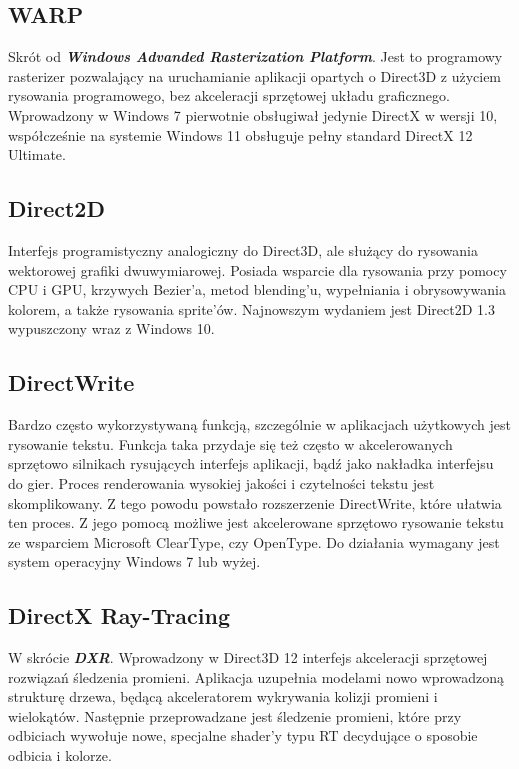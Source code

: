 \subsection{WARP}
Skrót od \emph{\textbf{Windows Advanded Rasterization Platform}}. Jest
to programowy rasterizer pozwalający na uruchamianie aplikacji opartych
o Direct3D z użyciem rysowania programowego, bez akceleracji sprzętowej
układu graficznego. Wprowadzony w Windows 7 pierwotnie obsługiwał jedynie DirectX w wersji
10, współcześnie na systemie Windows 11 obsługuje pełny standard DirectX
12 Ultimate.

\subsection{Direct2D}
Interfejs programistyczny analogiczny do Direct3D, ale służący do
rysowania wektorowej grafiki dwuwymiarowej. Posiada wsparcie dla
rysowania przy pomocy CPU i GPU, krzywych Bezier'a, metod blending'u,
wypełniania i obrysowywania kolorem, a także rysowania sprite'ów. Najnowszym wydaniem jest Direct2D 1.3 wypuszczony wraz z Windows 10.

\subsection{DirectWrite}
Bardzo często wykorzystywaną funkcją, szczególnie w aplikacjach
użytkowych jest rysowanie tekstu. Funkcja taka przydaje się też często w
akcelerowanych sprzętowo silnikach rysujących interfejs aplikacji, bądź
jako nakładka interfejsu do gier. Proces renderowania wysokiej jakości i czytelności tekstu jest
skomplikowany. Z tego powodu powstało rozszerzenie DirectWrite, które
ułatwia ten proces. Z jego pomocą możliwe jest akcelerowane sprzętowo
rysowanie tekstu ze wsparciem Microsoft ClearType, czy OpenType. Do
działania wymagany jest system operacyjny Windows 7 lub wyżej.

\subsection{DirectX Ray-Tracing}
W skrócie \emph{\textbf{DXR}}. Wprowadzony w Direct3D 12 interfejs
akceleracji sprzętowej rozwiązań śledzenia promieni. Aplikacja uzupełnia
modelami nowo wprowadzoną strukturę drzewa, będącą akceleratorem
wykrywania kolizji promieni i wielokątów. Następnie przeprowadzane jest
śledzenie promieni, które przy odbiciach wywołuje nowe, specjalne
shader'y typu RT decydujące o sposobie odbicia i kolorze.


